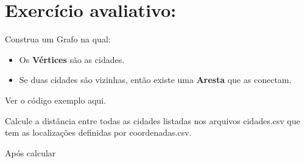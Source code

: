 \documentclass[12pt,a4paper]{article}
\begin{document}
\section*{Exercício avaliativo:}

Construa um Grafo na qual:

\begin{itemize}
    \item Os \textbf{Vértices} são as cidades.
    \item Se duas cidades são vizinhas, então existe uma \textbf{Aresta} que as conectam.
\end{itemize}

Ver o código exemplo aqui.


Calcule a distância entre todas as cidades listadas nos arquivos {\color{blue} cidades.csv} que tem as localizações definidas por {\color{blue} coordenadas.csv}.

Após calcular 
    
\end{document}
